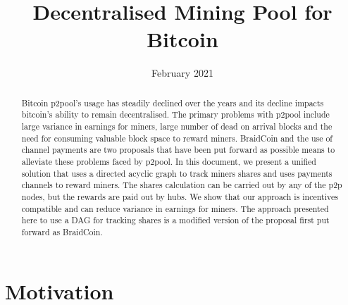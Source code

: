 \documentclass{article}
\title{Decentralised Mining Pool for Bitcoin}
\date{February 2021}
\begin{document}
\maketitle

\begin{abstract}
  Bitcoin p2pool's usage has steadily declined over the years and its
  decline impacts bitcoin's ability to remain decentralised. The
  primary problems with p2pool include large variance in earnings for
  miners, large number of dead on arrival blocks and the need for
  consuming valuable block space to reward miners.  BraidCoin and the
  use of channel payments are two proposals that have been put forward
  as possible means to alleviate these problems faced by p2pool. In
  this document, we present a unified solution that uses a directed
  acyclic graph to track miners shares and uses payments channels to
  reward miners. The shares calculation can be carried out by any of
  the p2p nodes, but the rewards are paid out by hubs. We show that
  our approach is incentives compatible and can reduce variance in
  earnings for miners. The approach presented here to use a DAG for
  tracking shares is a modified version of the proposal first put
  forward as BraidCoin.
\end{abstract}
   
\section{Motivation}



\end{document}
